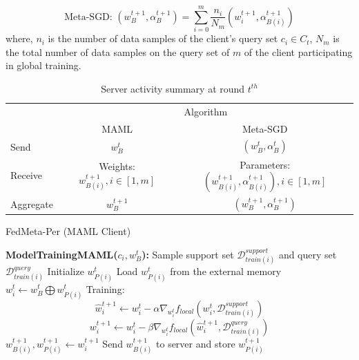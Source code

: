 \documentclass[runningheads]{llncs}
\begin{document}
\begin{dmath}
    \text{Meta-SGD: } (w_B^{t+1}, \alpha_B^{t+1}) = \sum_{i=0}^m \frac{n_i}{N_m} (w_i^{t+1}, \alpha_{B(i)}^{t+1})
\end{dmath} where, $n_i$ is the number of data samples of the client's query set $c_i\in C_t$, $N_m$ is the total number of data samples on the query set of $m$ of the client participating in global training.

\begin{table}[h]
    \centering
    \caption{Server activity summary at round $t^{th}$}
    \label{tab:param_fedmetaper}
    \begin{tabular}{l|c|c} 
    \toprule
    \multirow{2}{*}{} & \multicolumn{2}{c}{Algorithm}                                               \\ 
    \cline{2-3}
                      & MAML                          & Meta-SGD                                     \\ 
    \hline
    Send              & $w_B^t$                                & $(w_B^t, \alpha_B^t)$                        \\
    Receive           & Weights: $w_{B(i)}^{t+1}, i\in [1,m]$  & Parameters: $(w_{B(i)}^{t+1}, \alpha_{B(i)}^{t+1}), i\in [1,m]$  \\
    Aggregate         & $w_{B}^{t+1}$                          & $(w_B^{t+1}, \alpha_B^{t+1})$                    \\
    \bottomrule
    \end{tabular}
\end{table}

\begin{algorithm}[h]
    \caption{FedMeta-Per (MAML Client)} \label{alg:fedmaml_per_client}
    \begin{algorithmic}[1]
        \State\textbf{ModelTrainingMAML($c_i, w_B^t$):}
        \State Sample support set $\mathcal{D}_{train(i)}^{support}$ and query set $\mathcal{D}_{train(i)}^{query}$
            \State Initialize $w_{P(i)}^t$
        \Else
            \State Load $w_{P(i)}^t$ from the external memory
        \EndIf
        \State $w_i^t \gets w_B^t \bigoplus w_{P(i)}^t$ 
        \State Training: 
        \begin{dmath*}
            \hat{w}_{i}^{t+1} \gets w_{i}^t - \alpha\nabla_{w_i^t} f_{local}\left(w_{i}^t, \mathcal{D}_{train(i)}^{support}\right)
        \end{dmath*}
        \begin{dmath*}
            w_{i}^{t+1} \gets w_{i}^t - \beta\nabla_{w_i^t} f_{local}\left(\hat{w}_{i}^{t+1}, \mathcal{D}_{train(i)}^{query}\right)
        \end{dmath*}
        \State $w_{B(i)}^{t+1}, w_{P(i)}^{t+1} \gets w_i^{t+1}$ 
        \State Send $w_{B(i)}^{t+1}$ to server and store $w_{P(i)}^{t+1}$
    \end{algorithmic}
\end{algorithm}
\end{document}
